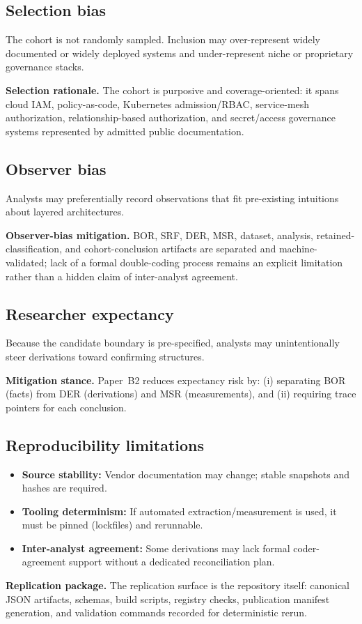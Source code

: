 \subsection{Selection bias}
The cohort is not randomly sampled. Inclusion may over-represent widely documented or widely deployed systems and under-represent niche or proprietary governance stacks.

\textbf{Selection rationale.} The cohort is purposive and coverage-oriented: it spans cloud IAM, policy-as-code, Kubernetes admission/RBAC, service-mesh authorization, relationship-based authorization, and secret/access governance systems represented by admitted public documentation.

\subsection{Observer bias}
Analysts may preferentially record observations that fit pre-existing intuitions about layered architectures.

\textbf{Observer-bias mitigation.} BOR, SRF, DER, MSR, dataset, analysis, retained-classification, and cohort-conclusion artifacts are separated and machine-validated; lack of a formal double-coding process remains an explicit limitation rather than a hidden claim of inter-analyst agreement.

\subsection{Researcher expectancy}
Because the candidate boundary is pre-specified, analysts may unintentionally steer derivations toward confirming structures.

\textbf{Mitigation stance.} Paper~B2 reduces expectancy risk by: (i) separating BOR (facts) from DER (derivations) and MSR (measurements), and (ii) requiring trace pointers for each conclusion.

\subsection{Reproducibility limitations}
\begin{itemize}
  \item \textbf{Source stability:} Vendor documentation may change; stable snapshots and hashes are required.
  \item \textbf{Tooling determinism:} If automated extraction/measurement is used, it must be pinned (lockfiles) and rerunnable.
  \item \textbf{Inter-analyst agreement:} Some derivations may lack formal coder-agreement support without a dedicated reconciliation plan.
\end{itemize}

\textbf{Replication package.} The replication surface is the repository itself: canonical JSON artifacts, schemas, build scripts, registry checks, publication manifest generation, and validation commands recorded for deterministic rerun.
